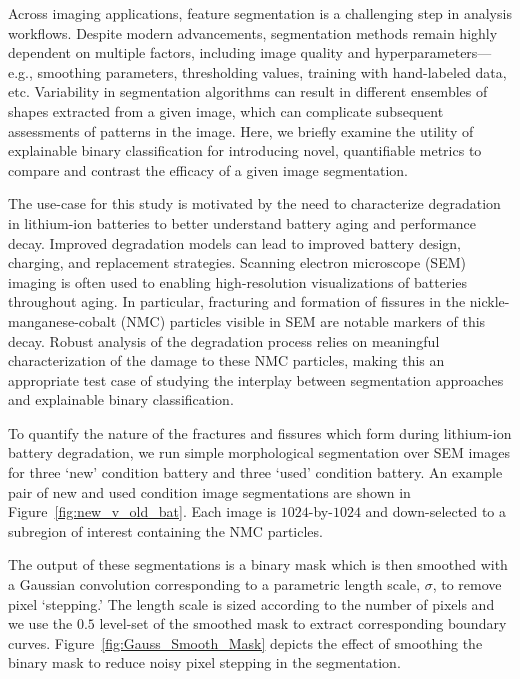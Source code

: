 \documentclass[pdflatex,iicol]{sn-jnl}%
\theoremstyle{thmstyleone}%
\theoremstyle{thmstyletwo}%
\theoremstyle{thmstylethree}%
\begin{document}
Across imaging applications, feature segmentation is a challenging step in analysis workflows. Despite modern advancements, segmentation methods remain highly dependent on multiple factors, including image quality and hyperparameters---e.g., smoothing parameters, thresholding values, training with hand-labeled data, etc. Variability in segmentation algorithms can result in different ensembles of shapes extracted from a given image, which can complicate subsequent assessments of patterns in the image. Here, we briefly examine the utility of explainable binary classification for introducing novel, quantifiable metrics to compare and contrast the efficacy of a given image segmentation.

The use-case for this study is motivated by the need to characterize degradation in lithium-ion batteries to better understand battery aging and performance decay. Improved degradation models can lead to improved battery design, charging, and replacement strategies. Scanning electron microscope (SEM) imaging is often used to enabling high-resolution visualizations of batteries throughout aging. In particular, fracturing and formation of fissures in the nickle-manganese-cobalt (NMC) particles visible in SEM are notable markers of this decay. Robust analysis of the degradation process relies on meaningful characterization of the damage to these NMC particles, making this an appropriate test case of studying the interplay between segmentation approaches and explainable binary classification.

To quantify the nature of the fractures and fissures which form during lithium-ion battery degradation, we run simple morphological segmentation over SEM images for three `new' condition battery and three `used' condition battery. An example pair of new and used condition image segmentations are shown in Figure~\ref{fig:new_v_old_bat}. Each image is $1024$-by-$1024$ and down-selected to a subregion of interest containing the NMC particles.

The output of these segmentations is a binary mask which is then smoothed with a Gaussian convolution corresponding to a parametric length scale, $\sigma$, to remove pixel `stepping.' The length scale is sized according to the number of pixels and we use the $0.5$ level-set of the smoothed mask to extract corresponding boundary curves. Figure~\ref{fig:Gauss_Smooth_Mask} depicts the effect of smoothing the binary mask to reduce noisy pixel stepping in the segmentation.
\end{document}
